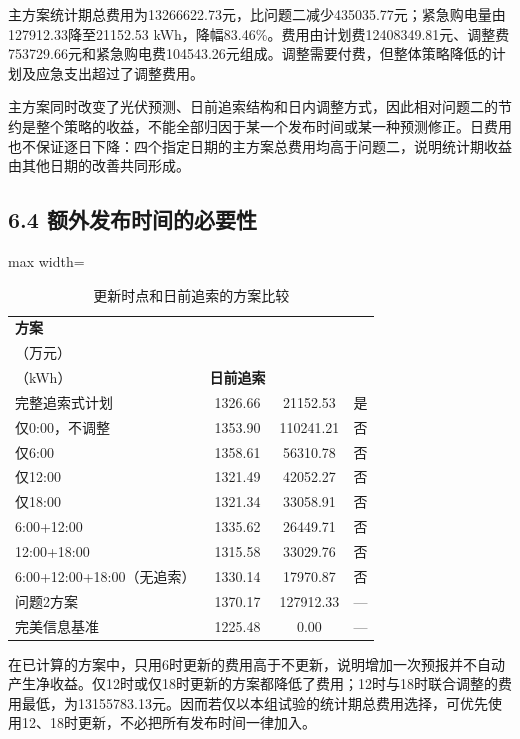 \documentclass[UTF8,a4paper,zihao=-4,fontset=windows]{ctexart}
\begin{document}
主方案统计期总费用为13266622.73元，比问题二减少435035.77元；紧急购电量由127912.33降至21152.53 kWh，降幅83.46\%。费用由计划费12408349.81元、调整费753729.66元和紧急购电费104543.26元组成。调整需要付费，但整体策略降低的计划及应急支出超过了调整费用。
\par
主方案同时改变了光伏预测、日前追索结构和日内调整方式，因此相对问题二的节约是整个策略的收益，不能全部归因于某一个发布时间或某一种预测修正。日费用也不保证逐日下降：四个指定日期的主方案总费用均高于问题二，说明统计期收益由其他日期的改善共同形成。
\par
\subsection{6.4 额外发布时间的必要性}
\begin{table}[H]\centering
\fontsize{9.5}{12}\selectfont\setlength{\tabcolsep}{4pt}\renewcommand{\arraystretch}{1.12}
\begin{adjustbox}{max width=\linewidth}\begin{tabular}{lccc}\toprule
\textbf{方案} & \shortstack{\textbf{总费用}\\{\normalfont （万元）}} & \shortstack{\textbf{紧急购电量}\\{\normalfont （kWh）}} & \textbf{日前追索}\\\midrule
完整追索式计划 & 1326.66 & 21152.53 & 是\\
仅0:00，不调整 & 1353.90 & 110241.21 & 否\\
仅6:00 & 1358.61 & 56310.78 & 否\\
仅12:00 & 1321.49 & 42052.27 & 否\\
仅18:00 & 1321.34 & 33058.91 & 否\\
6:00+12:00 & 1335.62 & 26449.71 & 否\\
12:00+18:00 & 1315.58 & 33029.76 & 否\\
6:00+12:00+18:00（无追索） & 1330.14 & 17970.87 & 否\\
问题2方案 & 1370.17 & 127912.33 & —\\
完美信息基准 & 1225.48 & 0.00 & —\\
\bottomrule\end{tabular}\end{adjustbox}
\caption{更新时点和日前追索的方案比较}
\end{table}
在已计算的方案中，只用6时更新的费用高于不更新，说明增加一次预报并不自动产生净收益。仅12时或仅18时更新的方案都降低了费用；12时与18时联合调整的费用最低，为13155783.13元。因而若仅以本组试验的统计期总费用选择，可优先使用12、18时更新，不必把所有发布时间一律加入。
\end{document}
